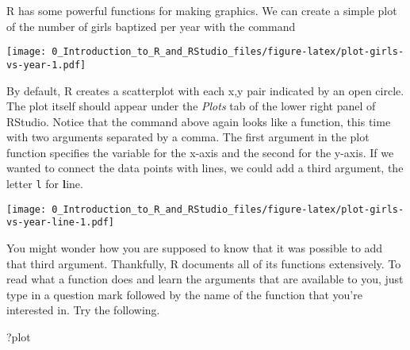 \documentclass[]{article}
\newenvironment{Shaded}{\begin{snugshade}}{\end{snugshade}}
\newcommand{\KeywordTok}[1]{\textcolor[rgb]{0.13,0.29,0.53}{\textbf{#1}}}
\newcommand{\DataTypeTok}[1]{\textcolor[rgb]{0.13,0.29,0.53}{#1}}
\newcommand{\StringTok}[1]{\textcolor[rgb]{0.31,0.60,0.02}{#1}}
\newcommand{\OperatorTok}[1]{\textcolor[rgb]{0.81,0.36,0.00}{\textbf{#1}}}
\newcommand{\NormalTok}[1]{#1}
\begin{document}
R has some powerful functions for making graphics. We can create a
simple plot of the number of girls baptized per year with the command

\begin{Shaded}
\end{Shaded}

\texttt{[image: 0\_Introduction\_to\_R\_and\_RStudio\_files/figure-latex/plot-girls-vs-year-1.pdf]}

By default, R creates a scatterplot with each x,y pair indicated by an
open circle. The plot itself should appear under the \emph{Plots} tab of
the lower right panel of RStudio. Notice that the command above again
looks like a function, this time with two arguments separated by a
comma. The first argument in the plot function specifies the variable
for the x-axis and the second for the y-axis. If we wanted to connect
the data points with lines, we could add a third argument, the letter
\texttt{l} for \textbf{l}ine.

\begin{Shaded}
\end{Shaded}

\texttt{[image: 0\_Introduction\_to\_R\_and\_RStudio\_files/figure-latex/plot-girls-vs-year-line-1.pdf]}

You might wonder how you are supposed to know that it was possible to
add that third argument. Thankfully, R documents all of its functions
extensively. To read what a function does and learn the arguments that
are available to you, just type in a question mark followed by the name
of the function that you're interested in. Try the following.

\begin{Shaded}
\begin{Highlighting}[]
\NormalTok{?plot}
\end{Highlighting}
\end{Shaded}
\end{document}
